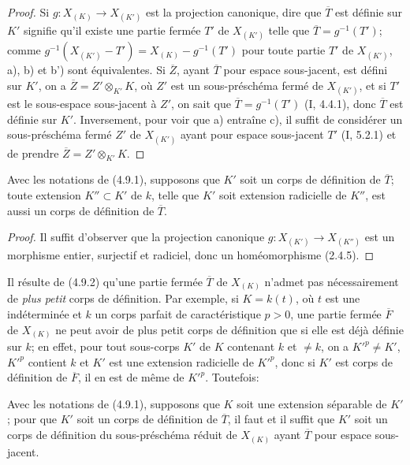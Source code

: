 \begin{proof}
Si $g:X_{(K)}\to X_{(K')}$ est la projection canonique, dire que
$\overline T$ est définie sur $K'$ signifie qu'il existe une partie fermée
$T'$ de $X_{(K')}$ telle que $\overline T=g^{-1}(T')$; comme
$g^{-1}(X_{(K')}-T')=X_{(K)}-g^{-1}(T')$ pour toute partie $T'$ de
$X_{(K')}$, a), b) et b') sont équivalentes. Si $\overline Z$, ayant
$\overline T$ pour espace sous-jacent, est défini sur $K'$, on a
$\overline Z=Z'\otimes_{K'}K$, où $Z'$ est un sous-préschéma fermé de
$X_{(K')}$, et si $T'$ est le sous-espace sous-jacent à $Z'$, on sait que
$\overline T=g^{-1}(T')$ (I, 4.4.1), donc $\overline T$ est définie sur
$K'$. Inversement, pour voir que a) entraîne c), il suffit de considérer un
sous-préschéma fermé $Z'$ de $X_{(K')}$ ayant pour espace sous-jacent $T'$
(I, 5.2.1) et de prendre $\overline Z=Z'\otimes_{K'}K$.
\end{proof}

\begin{corollary}[4.9.2]
\label{IV.2.4.9.2-fr}
Avec les notations de (4.9.1), supposons que $K'$ soit un corps de définition
de $\overline T$; toute extension $K''\subset K'$ de $k$, telle que $K'$ soit
extension radicielle de $K''$, est aussi un corps de définition de
$\overline T$.
\end{corollary}

\begin{proof}
Il suffit d'observer que la projection canonique
$g:X_{(K')}\to X_{(K'')}$ est un morphisme entier, surjectif et radiciel,
donc un homéomorphisme (2.4.5).
\end{proof}

\begin{remark}[4.9.3]
\label{IV.2.4.9.3-fr}
Il résulte de (4.9.2) qu'une partie fermée $\overline T$ de $X_{(K)}$ n'admet
pas nécessairement de \emph{plus petit} corps de définition. Par exemple, si
$K=k(t)$, où $t$ est une indéterminée et $k$ un corps parfait de
caractéristique $p>0$, une partie fermée $\overline F$ de $X_{(K)}$ ne peut
avoir de plus petit corps de définition que si elle est déjà définie sur $k$;
en effet, pour tout sous-corps $K'$ de $K$ contenant $k$ et $\ne k$, on a
$K'^p\ne K'$, $K'^p$ contient $k$ et $K'$
est une extension radicielle de $K'^p$, donc si $K'$ est corps de définition
de $\overline F$, il en est de même de $K'^p$. Toutefois:
\end{remark}

\begin{proposition}[4.9.4]
\label{IV.2.4.9.4-fr}
Avec les notations de \textup{(4.9.1)}, supposons que $K$ soit une extension séparable
de $K'$; pour que $K'$ soit un corps de définition de $\overline T$, il faut
et il suffit que $K'$ soit un corps de définition du sous-préschéma réduit de
$X_{(K)}$ ayant $\overline T$ pour espace sous-jacent.
\end{proposition}

